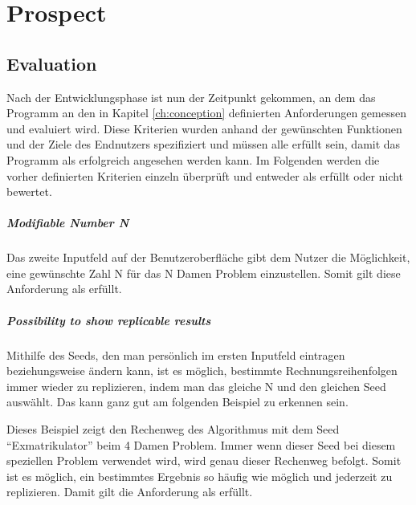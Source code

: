 
\chapter{Prospect}
\section{Evaluation}
Nach der Entwicklungsphase ist nun der Zeitpunkt gekommen, an dem das Programm an den in Kapitel \ref{ch:conception} definierten Anforderungen gemessen und evaluiert wird. Diese Kriterien wurden anhand der gewünschten Funktionen und der Ziele des Endnutzers spezifiziert und müssen alle erfüllt sein, damit das Programm als erfolgreich angesehen werden kann. Im Folgenden werden die vorher definierten Kriterien einzeln überprüft und entweder als erfüllt oder nicht bewertet.
\paragraph{Modifiable Number N}
Das zweite Inputfeld auf der Benutzeroberfläche gibt dem Nutzer die Möglichkeit, eine gewünschte Zahl N für das N Damen Problem einzustellen. Somit gilt diese Anforderung als erfüllt.
\paragraph{Possibility to show replicable results}
Mithilfe des Seeds, den man persönlich im ersten Inputfeld eintragen beziehungsweise ändern kann, ist es möglich, bestimmte Rechnungsreihenfolgen immer wieder zu replizieren, indem man das gleiche N und den gleichen Seed auswählt. Das kann ganz gut am folgenden Beispiel zu erkennen sein.
\begin{listing}
\end{listing}
Dieses Beispiel zeigt den Rechenweg des Algorithmus mit dem Seed \enquote{Exmatrikulator} beim 4 Damen Problem. Immer wenn dieser Seed bei diesem speziellen Problem verwendet wird, wird genau dieser Rechenweg befolgt. Somit ist es möglich, ein bestimmtes Ergebnis so häufig wie möglich und jederzeit zu replizieren. Damit gilt die Anforderung als erfüllt.
